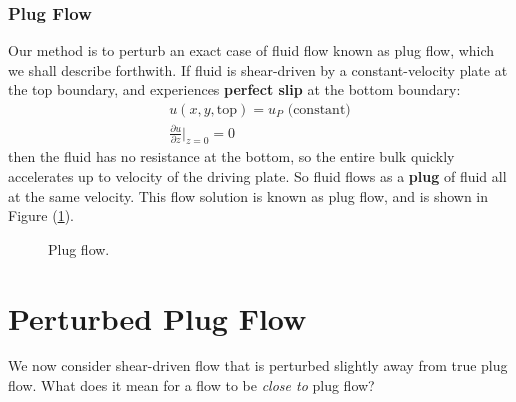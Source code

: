 \documentclass[12pt, a4paper, twoside, openright]{book}
\begin{document}


\subsubsection*{Plug Flow}

Our method is to perturb an exact case of fluid flow known as plug flow, which we shall describe forthwith.  If fluid is shear-driven by a constant-velocity plate at the top boundary, and experiences \textbf{perfect slip} at the bottom boundary:
\begin{gather}
u(x,y,\mathrm{top}) = u_P \text{  (constant)} \\
\frac{\partial u}{\partial z} \rvert_{z=0} = 0
\end{gather}
then the fluid has no resistance at the bottom, so the entire bulk quickly accelerates up to velocity of the driving plate.  So fluid flows as a \textbf{plug} of fluid all at the same velocity.  This flow solution is known as plug flow, and is shown in Figure (\ref{plugflow}).

\begin{figure}[H]
\centering
{}
\caption{Plug flow.} \label{plugflow}
\end{figure}


\section*{Perturbed Plug Flow}

We now consider shear-driven flow that is perturbed slightly away from true plug flow.  What does it mean for a flow to be \emph{close to} plug flow?
\end{document}
